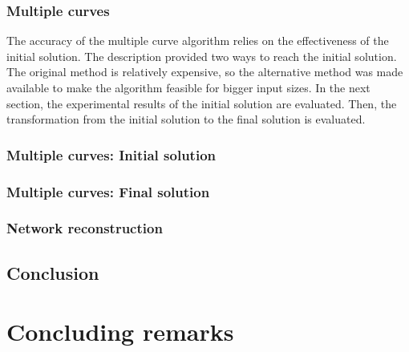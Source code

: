 \documentclass[11pt]{article}
\begin{document}
\subsubsection{Multiple curves}
The accuracy of the multiple curve algorithm relies on the effectiveness of the initial solution. The description provided two ways to reach the initial solution. The original method is relatively expensive, so the alternative method was made available to make the algorithm feasible for bigger input sizes. In the next section, the experimental results of the initial solution are evaluated. Then, the transformation from the initial solution to the final solution is evaluated.

\subsubsection*{Multiple curves: Initial solution}

\subsubsection*{Multiple curves: Final solution}


\subsubsection{Network reconstruction}

\subsection{Conclusion}

\section{Concluding remarks}
\end{document}
